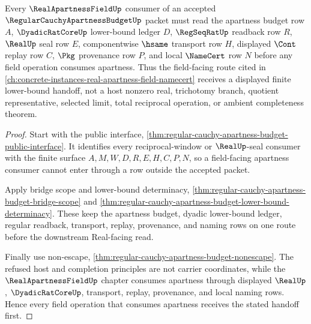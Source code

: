 \begin{theorem}
\label{thm:regular-cauchy-apartness-budget-field-handoff}
Every $\RealApartnessFieldUp$ consumer of an accepted $\RegularCauchyApartnessBudgetUp$ packet must read the apartness budget row $A$, $\DyadicRatCoreUp$ lower-bound ledger $D$, $\RegSeqRatUp$ readback row $R$, $\RealUp$ seal row $E$, componentwise $\hsame$ transport row $H$, displayed $\Cont$ replay row $C$, $\Pkg$ provenance row $P$, and local $\NameCert$ row $N$ before any field operation consumes apartness. Thus the field-facing route cited in \autoref{ch:concrete-instances-real-apartness-field-namecert} receives a displayed finite lower-bound handoff, not a host nonzero real, trichotomy branch, quotient representative, selected limit, total reciprocal operation, or ambient completeness theorem.
\end{theorem}
\begin{proof}
Start with the public interface, \autoref{thm:regular-cauchy-apartness-budget-public-interface}. It identifies every reciprocal-window or $\RealUp$-seal consumer with the finite surface $A,M,W,D,R,E,H,C,P,N$, so a field-facing apartness consumer cannot enter through a row outside the accepted packet.

Apply bridge scope and lower-bound determinacy, \autoref{thm:regular-cauchy-apartness-budget-bridge-scope} and \autoref{thm:regular-cauchy-apartness-budget-lower-bound-determinacy}. These keep the apartness budget, dyadic lower-bound ledger, regular readback, transport, replay, provenance, and naming rows on one route before the downstream Real-facing read.

Finally use non-escape, \autoref{thm:regular-cauchy-apartness-budget-nonescape}. The refused host and completion principles are not carrier coordinates, while the $\RealApartnessFieldUp$ chapter consumes apartness through displayed $\RealUp$, $\DyadicRatCoreUp$, transport, replay, provenance, and local naming rows. Hence every field operation that consumes apartness receives the stated handoff first.
\end{proof}

